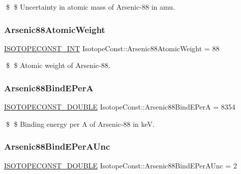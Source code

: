 \$ \$ Uncertainty in atomic mass of Arsenic-\/88 in amu. \mbox{\label{group___isotope_const-_arsenic-_as88_gaa2c54028a54e466fc0b7fba1e287c999}} 
\subsubsection{\texorpdfstring{Arsenic88\+Atomic\+Weight}{Arsenic88AtomicWeight}}
{\footnotesize\ttfamily \mbox{\hyperlink{group___isotope_const-_macros_ga5f18360b3e99483a35c32d789e62621c}{I\+S\+O\+T\+O\+P\+E\+C\+O\+N\+S\+T\+\_\+\+I\+NT}} Isotope\+Const\+::\+Arsenic88\+Atomic\+Weight = 88}

\$ \$ Atomic weight of Arsenic-\/88. \mbox{\label{group___isotope_const-_arsenic-_as88_ga545a8a5293785f99f6bee1fa909f84d8}} 
\subsubsection{\texorpdfstring{Arsenic88\+Bind\+E\+PerA}{Arsenic88BindEPerA}}
{\footnotesize\ttfamily \mbox{\hyperlink{group___isotope_const-_macros_ga8f45a7272ce02c0b4c65c44636ed719a}{I\+S\+O\+T\+O\+P\+E\+C\+O\+N\+S\+T\+\_\+\+D\+O\+U\+B\+LE}} Isotope\+Const\+::\+Arsenic88\+Bind\+E\+PerA = 8354}

\$ \$ Binding energy per A of Arsenic-\/88 in keV. \mbox{\label{group___isotope_const-_arsenic-_as88_ga0f822e188a802b6f394c93a734cd5432}} 
\subsubsection{\texorpdfstring{Arsenic88\+Bind\+E\+Per\+A\+Unc}{Arsenic88BindEPerAUnc}}
{\footnotesize\ttfamily \mbox{\hyperlink{group___isotope_const-_macros_ga8f45a7272ce02c0b4c65c44636ed719a}{I\+S\+O\+T\+O\+P\+E\+C\+O\+N\+S\+T\+\_\+\+D\+O\+U\+B\+LE}} Isotope\+Const\+::\+Arsenic88\+Bind\+E\+Per\+A\+Unc = 2}

